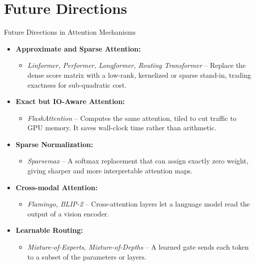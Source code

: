 \section{Future Directions}
\begin{frame}{Future Directions in Attention Mechanisms}
  \small
  \begin{itemize}
    \item[$\blacktriangleright$] \textbf{Approximate and Sparse Attention:}
      \begin{itemize}
        \item \textit{Linformer, Performer, Longformer, Routing Transformer} -- Replace the dense score matrix with a low-rank, kernelized or sparse stand-in, trading exactness for sub-quadratic cost.
      \end{itemize}
    \item[$\blacktriangleright$] \textbf{Exact but IO-Aware Attention:}
      \begin{itemize}
        \item \textit{FlashAttention} -- Computes the same attention, tiled to cut traffic to GPU memory. It saves wall-clock time rather than arithmetic.
      \end{itemize}
    \item[$\blacktriangleright$] \textbf{Sparse Normalization:}
      \begin{itemize}
        \item \textit{Sparsemax} -- A softmax replacement that can assign exactly zero weight, giving sharper and more interpretable attention maps.
      \end{itemize}
    \item[$\blacktriangleright$] \textbf{Cross-modal Attention:}
      \begin{itemize}
        \item \textit{Flamingo, BLIP-2} -- Cross-attention layers let a language model read the output of a vision encoder.
      \end{itemize}
    \item[$\blacktriangleright$] \textbf{Learnable Routing:}
      \begin{itemize}
        \item \textit{Mixture-of-Experts, Mixture-of-Depths} -- A learned gate sends each token to a subset of the parameters or layers.
      \end{itemize}
  \end{itemize}
\end{frame}
